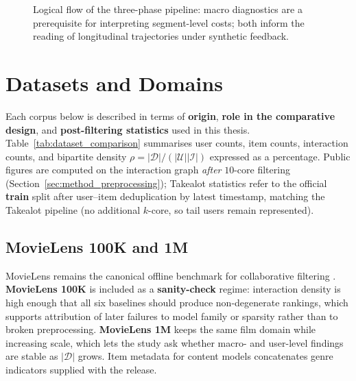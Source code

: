 \begin{figure}[htbp]
  \centering
  \caption{Logical flow of the three-phase pipeline: macro diagnostics are a prerequisite for interpreting segment-level costs; both inform the reading of longitudinal trajectories under synthetic feedback.}
  \label{fig:pipeline}
\end{figure}

\section{Datasets and Domains}
\label{sec:method_datasets}

Each corpus below is described in terms of \textbf{origin}, \textbf{role in the comparative design}, and \textbf{post-filtering statistics} used in this thesis. Table~\ref{tab:dataset_comparison} summarises user counts, item counts, interaction counts, and bipartite density $\rho = |\mathcal{D}|/(|\mathcal{U}||\mathcal{I}|)$ expressed as a percentage. Public figures are computed on the interaction graph \emph{after} $10$-core filtering (Section~\ref{sec:method_preprocessing}); Takealot statistics refer to the official \textbf{train} split after user--item deduplication by latest timestamp, matching the Takealot pipeline (no additional $k$-core, so tail users remain represented).

\subsection{MovieLens 100K and 1M}
MovieLens remains the canonical offline benchmark for collaborative filtering \citep{harper2015movielens}. \textbf{MovieLens 100K} is included as a \textbf{sanity-check} regime: interaction density is high enough that all six baselines should produce non-degenerate rankings, which supports attribution of later failures to model family or sparsity rather than to broken preprocessing. \textbf{MovieLens 1M} keeps the same film domain while increasing scale, which lets the study ask whether macro- and user-level findings are stable as $|\mathcal{D}|$ grows. Item metadata for content models concatenates genre indicators supplied with the release.

